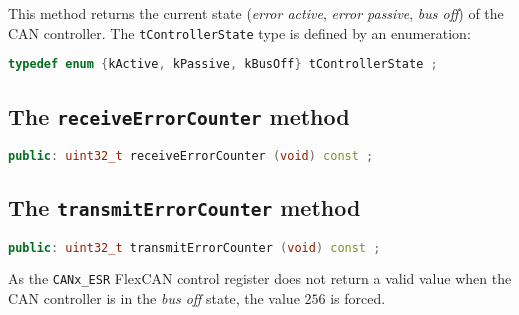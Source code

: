 \documentclass[10pt, a4paper, obeyspaces, openany]{extarticle}
\begin{document}
This method returns the current state (\emph{error active}, \emph{error passive}, \emph{bus off}) of the CAN controller. The \texttt{tControllerState} type is defined by an enumeration:
{ \small\begin{lstlisting}[language=c++]
typedef enum {kActive, kPassive, kBusOff} tControllerState ;
\end{lstlisting}}


\subsection{The \texttt{receiveErrorCounter} method}

{ \small\begin{lstlisting}[language=c++]
public: uint32_t receiveErrorCounter (void) const ;
\end{lstlisting}}



\subsection{The \texttt{transmitErrorCounter} method}

{ \small\begin{lstlisting}[language=c++]
public: uint32_t transmitErrorCounter (void) const ;
\end{lstlisting}}

As the \texttt{CANx\_ESR} FlexCAN control register does not return a valid value when the CAN controller is in the \emph{bus off} state, the value $256$ is forced.
\end{document}
